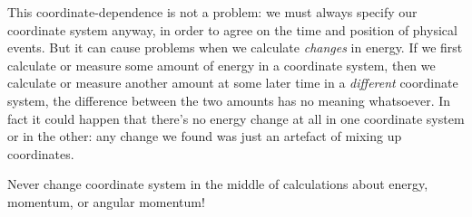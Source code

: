 \documentclass[a4paper,12pt,%
onecolumn,oneside,%
british%
]{memoir}
\renewcommand*{\|}[1][]{\nonscript\:#1\vert\nonscript\:\mathopen{}}
\begin{document}
This coordinate-dependence is not a problem: we must always specify our coordinate system anyway, in order to agree on the time and position of physical events. But it can cause problems when we calculate \emph{changes} in energy. If we first calculate or measure some amount of energy in a coordinate system, then we calculate or measure another amount at some later time in a \emph{different} coordinate system, the difference between the two amounts has no meaning whatsoever. In fact it could happen that there's no energy change at all in one coordinate system or in the other: any change we found was just an artefact of mixing up coordinates.

\begin{warning}
  Never change coordinate system in the middle of calculations about energy, momentum, or angular momentum!
\end{warning}



\bigskip
\end{document}

